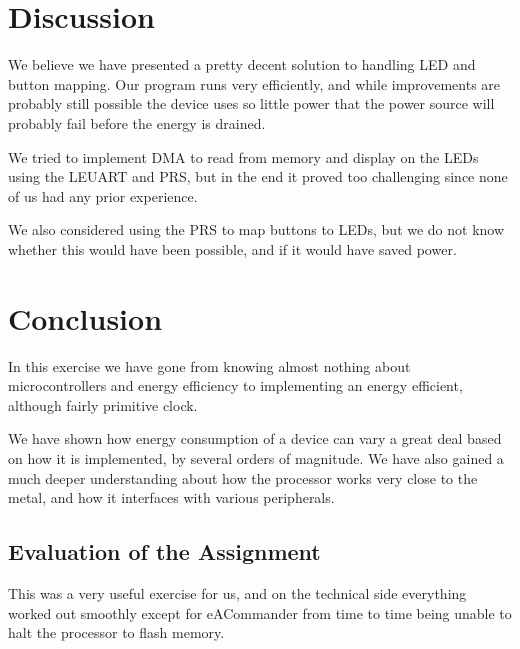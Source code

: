 \chapter{Discussion}
We believe we have presented a pretty decent solution to handling LED and button mapping. Our program runs very efficiently, and while improvements are probably still possible the device uses so little power that the power source will probably fail before the energy is drained.

We tried to implement DMA to read from memory and display on the LEDs using the LEUART and PRS, but in the end it proved too challenging since none of us had any prior experience. 

We also considered using the PRS to map buttons to LEDs, but we do not know whether this would have been possible, and if it would have saved power.

\chapter{Conclusion}
In this exercise we have gone from knowing almost nothing about microcontrollers and energy efficiency to implementing an energy efficient, although fairly primitive clock.

We have shown how energy consumption of a device can vary a great deal based on how it is implemented, by several orders of magnitude. We have also gained a much deeper understanding about how the processor works very close to the metal, and how it interfaces with various peripherals.

\section{Evaluation of the Assignment}
This was a very useful exercise for us, and on the technical side everything worked out smoothly except for eACommander from time to time being unable to halt the processor to flash memory.
